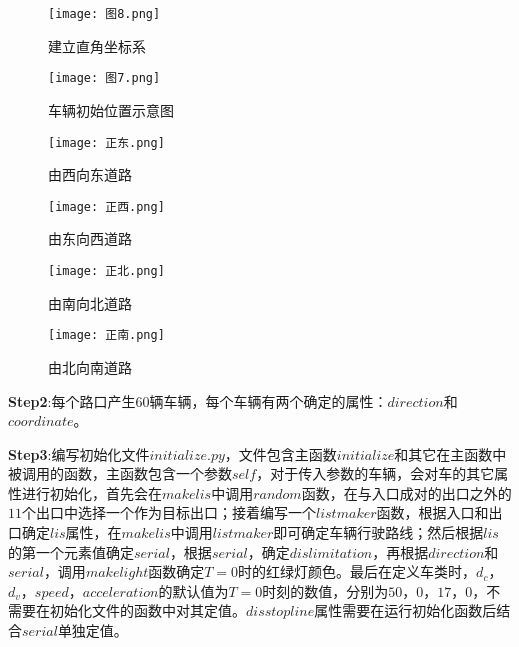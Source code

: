 \documentclass[a4paper,12pt]{article}
\numberwithin{equation}{section}
\begin{document}
	\begin{figure}[H]
	\centering
	\begin{minipage}[t]{0.48\textwidth}
		\centering
		\texttt{[image: 图8.png]}
		\caption{建立直角坐标系}
	\end{minipage}
	\begin{minipage}[t]{0.48\textwidth}
		\centering
		\texttt{[image: 图7.png]}
		\caption{车辆初始位置示意图}
	\end{minipage}
\end{figure}
	\begin{figure}[H]
		\centering
		\begin{minipage}[t]{0.48\textwidth}
			\centering
			\texttt{[image: 正东.png]}
			\caption{由西向东道路}
		\end{minipage}
		\begin{minipage}[t]{0.48\textwidth}
			\centering
			\texttt{[image: 正西.png]}
			\caption{由东向西道路}
		\end{minipage}
	\end{figure}
	\begin{figure}[H]
		\centering
		\begin{minipage}[t]{0.48\textwidth}
			\centering
			\texttt{[image: 正北.png]}
			\caption{由南向北道路}
		\end{minipage}
		\begin{minipage}[t]{0.48\textwidth}
			\centering
			\texttt{[image: 正南.png]}
			\caption{由北向南道路}
		\end{minipage}
	\end{figure}
		\textbf{Step2}:每个路口产生$60$辆车辆，每个车辆有两个确定的属性：$direction$和$coordinate$。\par
	\textbf{Step3}:编写初始化文件$initialize.py$，文件包含主函数$initialize$和其它在主函数中被调用的函数，主函数包含一个参数$self$，对于传入参数的车辆，会对车的其它属性进行初始化，首先会在$makelis$中调用$random$函数，在与入口成对的出口之外的$11$个出口中选择一个作为目标出口；接着编写一个$listmaker$函数，根据入口和出口确定$lis$属性，在$makelis$中调用$listmaker$即可确定车辆行驶路线；然后根据$lis$的第一个元素值确定$serial$，根据$serial$，确定$dislimitation$，再根据$direction$和$serial$，调用$makelight$函数确定$T=0$时的红绿灯颜色。最后在定义车类时，$d_c$，$d_v$，$speed$，$acceleration$的默认值为$T=0$时刻的数值，分别为$50$，$0$，$17$，$0$，不需要在初始化文件的函数中对其定值。$disstopline$属性需要在运行初始化函数后结合$serial$单独定值。\par
\end{document}
